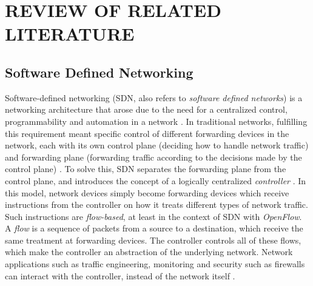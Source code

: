 \chapter{REVIEW OF RELATED LITERATURE}

\section{Software Defined Networking}
Software-defined networking (SDN, also refers to \textit{software defined networks}) is a networking architecture that arose due to the need for a centralized control, programmability and automation in a network \cite{open_networking_foundation_software-defined_2013}. In traditional networks, fulfilling this requirement meant specific control of different forwarding devices in the network, each with its own control plane (deciding how to handle network traffic) and forwarding plane (forwarding traffic according to the decisions made by the control plane) \cite{kreutz_software-defined_2015}. To solve this, SDN separates the forwarding plane from the control plane, and introduces the concept of a logically centralized \textit{controller} \cite{open_networking_foundation_software-defined_2013}. In this model, network devices simply become forwarding devices which receive instructions from the controller on how it treats different types of network traffic. Such instructions are \textit{flow-based}, at least in the context of SDN with \textit{OpenFlow}. A \textit{flow} is a sequence of packets from a source to a destination, which receive the same treatment at forwarding devices. The controller controls all of these flows, which make the controller an abstraction of the underlying network. Network applications such as traffic engineering, monitoring and security such as firewalls can interact with the controller, instead of the network itself \cite{kreutz_software-defined_2015}.

